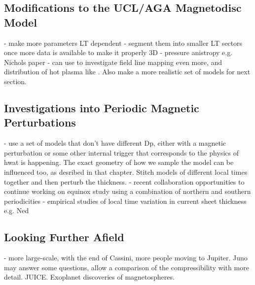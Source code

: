 \subsection{Modifications to the UCL/AGA Magnetodisc Model}
- make more parameters LT dependent
- segment them into  smaller LT sectors once more data  is available to make it properly 3D
- pressure anistropy e.g. Nichols paper
- can use to investigate field line mapping even more, and distribution of hot plasma like \citet{sergis2018}. Also make a more realistic set of models for  next section.

\subsection{Investigations into Periodic Magnetic Perturbations}
- use a set of models that don't have different Dp, either with a magnetic perturbation or some other internal trigger that corresponds to the physics of hwat is happening. The exact geometry of  how we sample the model can be influenced too, as desribed in that chapter. Stitch models of different local times together and  then perturb  the thickness.
- recent collaboration opportunities to continue working on equinox study using a combination of northern and southern periodicities
- empirical studies of local time variation in current sheet thickness e.g. Ned

\subsection{Looking Further Afield}
- more large-scale, with the end of Cassini, more  people moving  to Jupiter. Juno may answer some questions, allow a comparison of the compressibility with more detail. JUICE.
Exoplanet discoveries of magnetospheres.